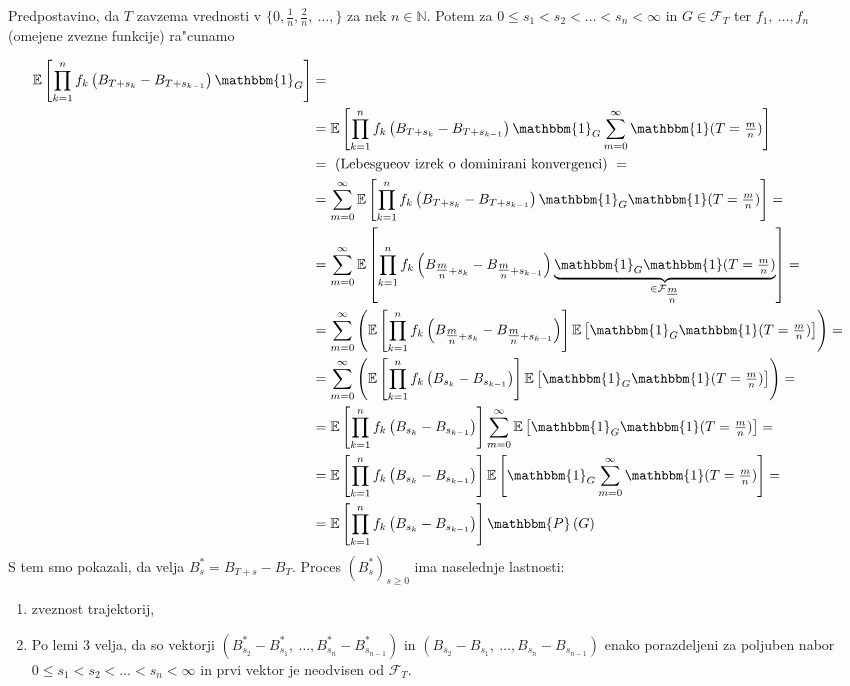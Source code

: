 \documentclass[twoside,11pt]{article}
\begin{document}
\begin{dokaz}
    Predpostavino, da $T$ zavzema vrednosti v $\{0, \tfrac{1}{n}, \tfrac{2}{n}, \ \ldots, \}$ za nek $n\in\mathbb{N}$. 
    Potem za $0 \leq s_1 < s_2 < \ldots < s_n < \infty$ in $G \in \mathcal{F}_T$ ter $f_1, \ \ldots, f_n$ (omejene zvezne funkcije) ra"cunamo

    \begin{align*}
        \mathbb{E}\left[\prod_{k=1}^nf_k\left(B_{T+s_k} - B_{T + s_{k-1}}\right)\mathbbm{1}_G\right] &= \\
        &=\mathbb{E}\left[\prod_{k=1}^nf_k\left(B_{T+s_k} - B_{T + s_{k-1}}\right)\mathbbm{1}_G\sum_{m=0}^\infty\mathbbm{1}(T=\tfrac{m}{n})\right] \\
        &= \ (\text{Lebesgueov izrek o dominirani konvergenci}) \ = \\
        &=\sum_{m=0}^\infty\mathbb{E}\left[\prod_{k=1}^nf_k\left(B_{T+s_k} - B_{T + s_{k-1}}\right)\mathbbm{1}_G\mathbbm{1}(T = \tfrac{m}{n})\right] = \\
        &=\sum_{m=0}^\infty\mathbb{E}\left[\prod_{k=1}^nf_k\left(B_{\tfrac{m}{n}+s_k} - B_{\tfrac{m}{n} + s_{k-1}}\right)\underbrace{\mathbbm{1}_G\mathbbm{1}(T = \tfrac{m}{n})}_{\in \mathcal{F}_{\tfrac{m}{n}}}\right] = \\
        &= \sum_{m=0}^\infty\left(\mathbb{E}\left[\prod_{k=1}^nf_k\left(B_{\tfrac{m}{n}+s_k} - B_{\tfrac{m}{n} + s_{k-1}}\right)\right]\mathbb{E}\left[\mathbbm{1}_G\mathbbm{1}(T = \tfrac{m}{n})\right]\right) = \\
        &= \sum_{m=0}^\infty\left(\mathbb{E}\left[\prod_{k=1}^nf_k\left(B_{s_k} - B_{s_{k-1}}\right)\right]\mathbb{E}\left[\mathbbm{1}_G\mathbbm{1}(T = \tfrac{m}{n})\right]\right) = \\
        &= \mathbb{E}\left[\prod_{k=1}^nf_k\left(B_{s_k} - B_{s_{k-1}}\right)\right]\sum_{m=0}^\infty\mathbb{E}\left[\mathbbm{1}_G\mathbbm{1}(T=\tfrac{m}{n})\right] = \\
        &= \mathbb{E}\left[\prod_{k=1}^nf_k\left(B_{s_k} - B_{s_{k-1}}\right)\right]\mathbb{E}\left[\mathbbm{1}_G\sum_{m=0}^\infty\mathbbm{1}(T=\tfrac{m}{n})\right] = \\
        &= \mathbb{E}\left[\prod_{k=1}^nf_k\left(B_{s_k} - B_{s_{k-1}}\right)\right]\mathbbm{P}\left(G\right) \\
    \end{align*} 
    S tem smo pokazali, da velja $B^*_s = B_{T+s} - B_T$. Proces $(B^*_s)_{s\geq0}$ ima naselednje lastnosti:
    \begin{enumerate}
        \item zveznost trajektorij,
        \item Po lemi 3 velja, da so vektorji $(B^*_{s_2} - B^*_{s_1}, \ \ldots, B^*_{s_n} - B^*_{s_{n-1}})$ in $(B_{s_2} - B_{s_1}, \ \ldots, B_{s_n} - B_{s_{n-1}})$ enako porazdeljeni za poljuben nabor $0 \leq s_1 < s_2 < \ldots < s_n < \infty$ in prvi vektor je neodvisen od $\mathcal{F}_T$.


\end{enumerate}
\end{dokaz}
\end{document}
